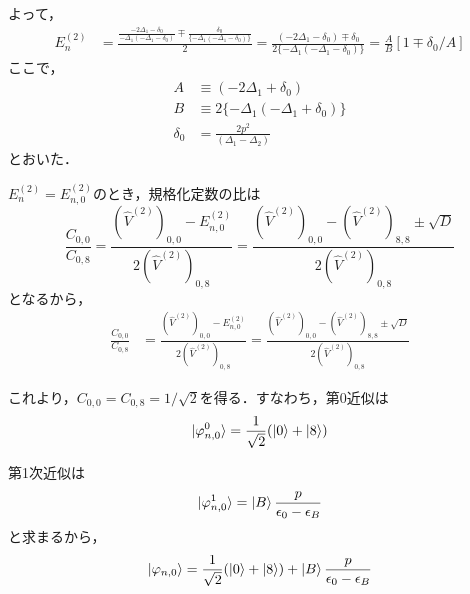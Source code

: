 よって，
\begin{align}
    E^{(2)}_n&=\frac{
    \frac{-2\Delta_1 - \delta_0}{-\Delta_1(-\Delta_1 - \delta_0)}
    \mp 
    \frac{\delta_0}
    {\{-\Delta_1(-\Delta_1 - \delta_0)\}}
    }{2}
    =\frac{
    (-2\Delta_1 - \delta_0)
    \mp \delta_0
    }{2\{-\Delta_1(-\Delta_1 - \delta_0)\}}
    =\frac{A}{B}[1\mp\delta_0/A]
\end{align}
ここで，
\begin{align}
    A&\equiv (-2\Delta_1 + \delta_0)\\[10pt]
    B&\equiv 2\{-\Delta_1(-\Delta_1 + \delta_0)\}\\[10pt]
    \delta_0 &= \frac{2p^2}{(\Delta_{1}-\Delta_{2})}
\end{align}
とおいた．

$E_n^{(2)}=E_{n,0}^{(2)}$のとき，規格化定数の比は
\begin{equation}
    \frac{C_{0,0}}{C_{0,8}} 
    = \frac{(\hat{V}^{(2)})_{0,0} - E_{n,0}^{(2)}}{2(\hat{V}^{(2)})_{0,8} }
    =  \frac{(\hat{V}^{(2)})_{0,0} - (\hat{V}^{(2)})_{8,8} \pm \sqrt{D}}
    {2(\hat{V}^{(2)})_{0,8} }
\end{equation}
となるから，
\begin{align}
    \frac{C_{0,0}}{C_{0,8}} 
    &= \frac{(\hat{V}^{(2)})_{0,0} - E_{n,0}^{(2)}}{2(\hat{V}^{(2)})_{0,8}}
    =  \frac{(\hat{V}^{(2)})_{0,0} - (\hat{V}^{(2)})_{8,8} \pm \sqrt{D}}
    {2(\hat{V}^{(2)})_{0,8} }
\end{align}


これより，$C_{0,0}=C_{0,8}=1/\sqrt{2}$を得る．すなわち，第0近似は
\begin{equation}
    \ket{\varphi_{n,0}^{0}} = \frac{1}{\sqrt{2}}(\ket{0}+\ket{8})
\end{equation}

第1次近似は
\begin{equation}
    \ket{\varphi_{n,0}^{1}} = \ket{B}\frac{p}{\epsilon_0-\epsilon_{B}}
\end{equation}
と求まるから，
\begin{equation}
     \ket{\varphi_{n,0}} 
     = \frac{1}{\sqrt{2}}(\ket{0}+\ket{8}) + \ket{B}\frac{p}{\epsilon_0-\epsilon_{B}}
\end{equation}






